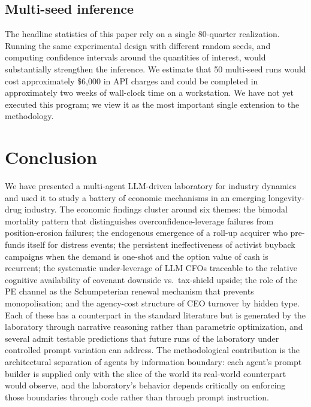 \documentclass[11pt]{article}
\begin{document}
\subsection{Multi-seed inference}

The headline statistics of this paper rely on a single 80-quarter
realization. Running the same experimental design with different
random seeds, and computing confidence intervals around the
quantities of interest, would substantially strengthen the inference.
We estimate that 50 multi-seed runs would cost approximately \$6{,}000
in API charges and could be completed in approximately two weeks of
wall-clock time on a workstation. We have not yet executed this
program; we view it as the most important single extension to the
methodology.

\section{Conclusion}\label{sec:conclusion}

We have presented a multi-agent LLM-driven laboratory for industry
dynamics and used it to study a battery of economic mechanisms in an
emerging longevity-drug industry. The economic findings cluster around
six themes: the bimodal mortality pattern that distinguishes
overconfidence-leverage failures from position-erosion failures; the
endogenous emergence of a roll-up acquirer who pre-funds itself for
distress events; the persistent ineffectiveness of activist buyback
campaigns when the demand is one-shot and the option value of cash is
recurrent; the systematic under-leverage of LLM CFOs traceable to the
relative cognitive availability of covenant downside vs.\ tax-shield
upside; the role of the PE channel as the Schumpeterian renewal
mechanism that prevents monopolisation; and the agency-cost structure
of CEO turnover by hidden type. Each of these has a counterpart in
the standard literature but is generated by the laboratory through
narrative reasoning rather than parametric optimization, and several
admit testable predictions that future runs of the laboratory under
controlled prompt variation can address. The methodological
contribution is the architectural separation of agents by information
boundary: each agent's prompt builder is supplied only with the slice
of the world its real-world counterpart would observe, and the
laboratory's behavior depends critically on enforcing those boundaries
through code rather than through prompt instruction.
\end{document}

